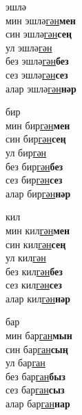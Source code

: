 \begin{multicols}{4}
\begin{enumerate}
\begin{minipage}{\linewidth}
    \item
    эшлә\\
    мин эшлә\underline{гән}\textbf{мен}\\
    син эшлә\underline{гән}\textbf{сең}\\
    ул эшлә\underline{гән}\\
    без эшлә\underline{гән}\textbf{без}\\
    сез эшлә\underline{гән}\textbf{сез}\\
    алар эшлә\underline{гән}\textbf{нәр}\\
\end{minipage}

\begin{minipage}{\linewidth}
    \item
    бир\\
    мин бир\underline{гән}\textbf{мен}\\
    син бир\underline{гән}\textbf{сең}\\
    ул бир\underline{гән}\\
    без бир\underline{гән}\textbf{без}\\
    сез бир\underline{гән}\textbf{сез}\\
    алар бир\underline{гән}\textbf{нәр}\\
\end{minipage}

\begin{minipage}{\linewidth}
    \item
    кил\\
    мин кил\underline{гән}\textbf{мен}\\
    син кил\underline{гән}\textbf{сең}\\
    ул кил\underline{гән}\\
    без кил\underline{гән}\textbf{без}\\
    сез кил\underline{гән}\textbf{сез}\\
    алар кил\underline{гән}\textbf{нәр}\\
\end{minipage}

\begin{minipage}{\linewidth}
    \item
    бар\\
    мин бар\underline{ган}\textbf{мын}\\
    син бар\underline{ган}\textbf{сың}\\
    ул бар\underline{ган}\\
    без бар\underline{ган}\textbf{быз}\\
    сез бар\underline{ган}\textbf{сыз}\\
    алар бар\underline{ган}\textbf{нар}\\
\end{minipage}


\end{enumerate}
\end{multicols}
